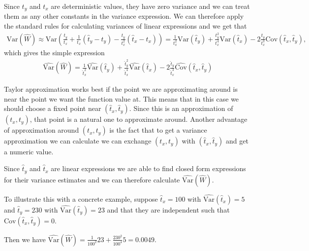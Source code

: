 \documentclass{article}
\begin{document}
\begin{example}
    Since \(t_y\) and \(t_x\) are deterministic values, they have zero variance
    and we can treat them as any other constants in the variance expression. We can therefore apply
    the standard rules for calculating variances of linear expressions and we
    get that
    \begin{align*}
      \mathrm{Var} \left( \widehat{W} \right) \approx \mathrm{Var} \left(
      \frac{t_y}{t_x} + \frac{1}{t_x} \left( \hat{t}_y - t_y \right) -
      \frac{t_y}{t_x^2} \left( \hat{t}_x - t_x \right) \right)
    = \frac{1}{t_x^2} \mathrm{Var} \left( \hat{t}_y \right) +
      \frac{t_y^2}{t_x^4} \mathrm{Var} \left( \hat{t}_x \right) -
      2 \frac{t_y}{t_x^3}\mathrm{Cov}(\hat{t}_x, \hat{t}_y),
      \end{align*}
      which gives the simple expression \begin{align*}
                    \widehat{\mathrm{Var}} \left( \widehat{W} \right) = \frac{1}{\hat{t}_x^2} \widehat{\mathrm{Var}} \left( \hat{t}_y \right) +
                    \frac{\hat{t}_y^2}{\hat{t}_x^4} \widehat{\mathrm{Var}} \left( \hat{t}_x \right) - 2 \frac{\hat{t}_y}{\hat{t}_x^3}\widehat{\mathrm{Cov}}(\hat{t}_x, \hat{t}_y)
                    \end{align*}

    Taylor approximation works best if the point we are approximating around is
    near the point we want the function value at. This means that in this case we should
    choose a fixed point near \((\hat{t}_x, \hat{t}_y)\). Since this is an approximation
    of \((t_x, t_y)\), that point is a natural one to approximate around. Another
    advantage of approximation around \((t_x, t_y)\) is the fact that to get a
    variance approximation we can calculate we can exchange \((t_x,
    t_y)\) with \((\hat{t}_x, \hat{t}_y)\) and get a numeric value.

    Since \(\hat{t}_y\) and \(\hat{t}_x\) are linear expressions we are able to
    find closed form expressions for their variance estimates and we can
    therefore calculate \(\widehat{\mathrm{Var}} \left( \widehat{W} \right)\).

    To illustrate this with a concrete example, suppose \(\hat{t}_x = 100\) with
    \(\widehat{\mathrm{Var}}\left( \hat{t}_x \right) = 5\) and \(\hat{t}_y = 230\) with
    \(\widehat{\mathrm{Var}}\left( \hat{t}_y \right) = 23\) and that they are independent
    such that \(\mathrm{Cov} \left( \hat{t}_x, \hat{t}_y \right) = 0\).

    Then we have \(\widehat{\mathrm{Var}} \left( \widehat{W} \right) =
    \frac{1}{100^2} 23 + \frac{230^2}{100^4} 5 = 0.0049.\)

\end{example}
\end{document}
